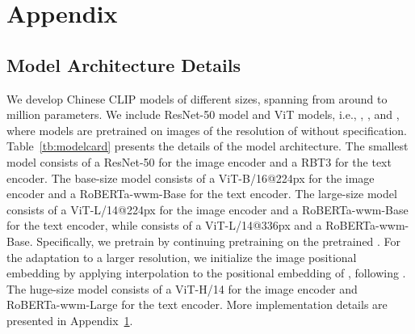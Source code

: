 \documentclass[11pt]{article}
\begin{document}



\newpage
\appendix

\section{Appendix}
\label{sec:implementation_details}

\subsection{Model Architecture Details}
\label{subsec:model_hyperparams}


We develop  Chinese CLIP models of different sizes, spanning from around  to  million parameters. 
We include  ResNet-50 model  and  ViT models, i.e., , ,  and , where models are pretrained on images of the resolution of  without specification. 
Table~\ref{tb:modelcard} presents the details of the model architecture. 
The smallest model  consists of a ResNet-50 for the image encoder and a RBT3 for the text encoder. 
The base-size model  consists of a ViT-B/16@224px for the image encoder and a RoBERTa-wwm-Base for the text encoder. 
The large-size model  consists of a ViT-L/14@224px for the image encoder and a RoBERTa-wwm-Base for the text encoder, while  consists of a ViT-L/14@336px and a RoBERTa-wwm-Base. 
Specifically, we pretrain  by continuing pretraining on the pretrained . 
For the adaptation to a larger resolution, we initialize the image positional embedding by applying interpolation to the positional embedding of , following \citet{openclip}. 
The huge-size model  consists of a ViT-H/14 for the image encoder and RoBERTa-wwm-Large for the text encoder. 
More implementation details are presented in Appendix~\ref{sec:implementation_details}.
\end{document}
